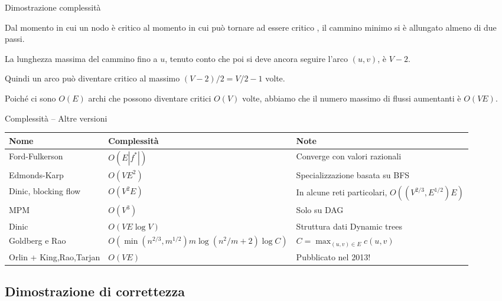 \begin{frame}{Dimostrazione complessità}

\BIL
\item Dal momento in cui un nodo è critico al momento in cui può tornare ad essere critico , il cammino minimo si è allungato almeno di due passi.
\item La lunghezza massima del cammino fino a $u$, tenuto conto che poi si deve ancora seguire l'arco $(u,v)$,
è $V-2$. 
\item Quindi un arco può diventare critico al massimo $(V-2)/2 = V/2-1$ volte. 
\item Poiché ci sono $O(E)$ archi che possono diventare critici $O(V)$ volte,
abbiamo che il numero massimo di flussi aumentanti è $O(VE)$. 
\EIL

\end{frame}


\begin{frame}{Complessità -- Altre versioni}

\small
\begin{tabular}{|P{2.6cm}|P{4.5cm}|P{3.9cm}|}
\hline
\textbf{Nome} & \textbf{Complessità} & \textbf{Note} \\\hline
Ford-Fulkerson & $O(E|f^*|)$ & Converge con valori razionali \\\hline
Edmonds-Karp & $O(VE^2)$ & Specializzazione basata su BFS \\\hline
Dinic, blocking flow & $O(V^2E)$ & In alcune reti particolari, $O((V^{2/3},E^{1/2})E)$ \\\hline
MPM & $O(V^3)$ & Solo su DAG \\\hline
Dinic & $O(VE \log V)$ & Struttura dati Dynamic trees \\\hline
Goldberg e Rao & \begingroup \footnotesize $O(\min(n^{2/3},m^{1/2})m \log (n^2/m+2) \log C)$ \endgroup & $C=\max_{(u,v) \in E} c(u,v)$ \\\hline
Orlin + King,Rao,Tarjan & $O(VE)$ & Pubblicato nel 2013!\\\hline
\end{tabular}

\end{frame}


\subsection{Dimostrazione di correttezza}

